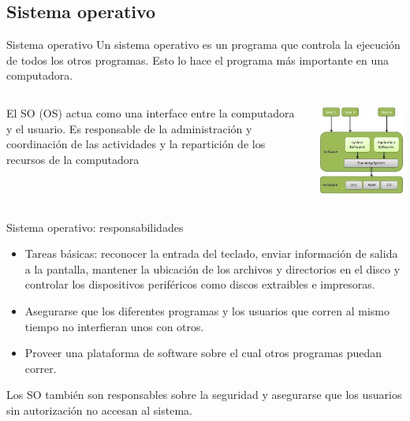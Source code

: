 \documentclass[11pt]{beamer}
\begin{document}
	\subsection{Sistema operativo}
		\begin{frame}{Sistema operativo}
			Un sistema operativo es un programa que controla la ejecución de todos los otros programas. Esto lo hace el programa más importante en una computadora.
			 \begin{columns}
			 	\begin{column}{0.5\textwidth}
					El SO (OS) actua como una interface entre la computadora y el usuario. Es responsable de la administración y coordinación de las actividades y la repartición de los recursos de la computadora
				\end{column}
				\begin{column}{0.5\textwidth}
					\includegraphics[scale=0.5]{so.jpg}
				\end{column}
			\end{columns}
		\end{frame}
		\begin{frame}{Sistema operativo: responsabilidades}
			\begin{itemize}
				\item Tareas básicas: reconocer la entrada del teclado, enviar información de salida a la pantalla, mantener la ubicación de los archivos y directorios en el disco y controlar los dispositivos periféricos como discos extraibles e impresoras.
				\item Asegurarse que los diferentes programas y los usuarios que corren al mismo tiempo no interfieran unos con otros.
				\item Proveer una plataforma de software sobre el cual otros programas puedan correr.
			\end{itemize}
			Los SO también son responsables sobre la seguridad y asegurarse que los usuarios sin autorización no accesan al sistema.
		\end{frame}
\end{document}
